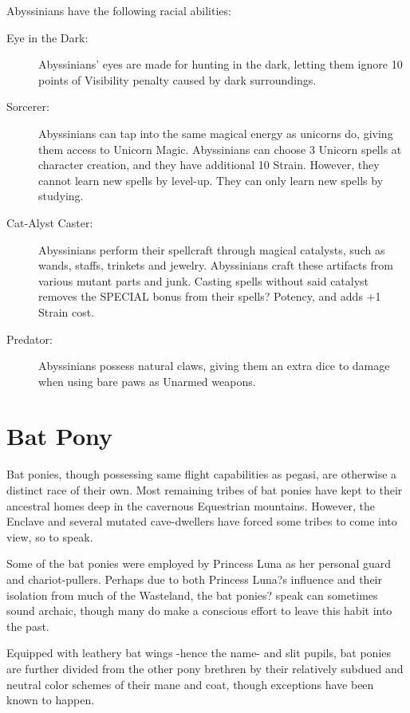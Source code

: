 \documentclass[11pt,a4paper,twocolumn]{book}
\begin{document}
	Abyssinians have the following racial abilities:
	\begin{description}
		\item[Eye in the Dark:] Abyssinians' eyes are made for hunting in the dark, letting them ignore 10 points of Visibility penalty caused by dark surroundings.
		\item[Sorcerer:] Abyssinians can tap into the same magical energy as unicorns do, giving them access to Unicorn Magic. Abyssinians can choose 3 Unicorn spells at character creation, and they have additional 10 Strain. However, they cannot learn new spells by level-up. They can only learn new spells by studying.
		\item[Cat-Alyst Caster:] Abyssinians perform their spellcraft through magical catalysts, such as wands, staffs, trinkets and jewelry. Abyssinians craft these artifacts from various mutant parts and junk. Casting spells without said catalyst removes the SPECIAL bonus from their spells? Potency, and adds +1 Strain cost.
		\item[Predator:] Abyssinians possess natural claws, giving them an extra dice to damage when using bare paws as Unarmed weapons.
	\end{description}
	
	\clearpage
	
	\section*{Bat Pony}
	Bat ponies, though possessing same flight capabilities as pegasi, are otherwise a distinct race of their own. Most remaining tribes of bat ponies have kept to their ancestral homes deep in the cavernous Equestrian mountains. However, the Enclave and several mutated cave-dwellers have forced some tribes to come into view, so to speak.
	
	Some of the bat ponies were employed by Princess Luna as her personal guard and chariot-pullers. Perhaps due to both Princess Luna?s influence and their isolation from much of the Wasteland, the bat ponies? speak can sometimes sound archaic, though many do make a conscious effort to leave this habit into the past.
	
	Equipped with leathery bat wings -hence the name- and slit pupils, bat ponies are further divided from the other pony brethren by their relatively subdued and neutral color schemes of their mane and coat, though exceptions have been known to happen.
	
\end{document}
